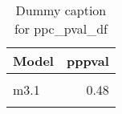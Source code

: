 \begin{table}
\centering
\caption{Dummy caption for ppc_pval_df}
\centering
\fontsize{10}{12}\selectfont
\begin{tabular}[t]{lr}
\toprule
Model & pppval\\
\midrule
\cellcolor{gray!10}{m2} & \cellcolor{gray!10}{0.45}\\
m3.1 & 0.48\\
\cellcolor{gray!10}{m4} & \cellcolor{gray!10}{0.44}\\
\bottomrule
\end{tabular}
\end{table}
